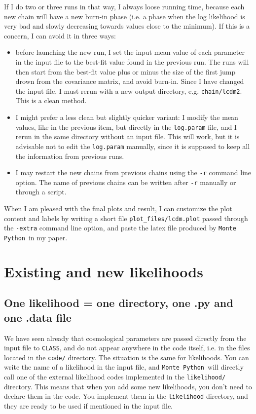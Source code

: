 \documentclass[10pt]{article}
\newcommand{\CLASS}{\texttt{CLASS}}
\newcommand{\MP}{\texttt{Monte Python}}
\begin{document}
If I do two or three runs in that way, I always loose running time, because each new chain will have a new burn-in phase (i.e. a phase when the log likelihood is very bad and slowly decreasing towards values close to the minimum). If this is a concern, I can avoid it in three ways:
\begin{itemize}
\item before launching the new run, I set the input mean value of each parameter in the input file to the best-fit value found in the previous run. The runs will then start from the best-fit value plus or minus the size of the first jump drown from the covariance matrix, and avoid burn-in. Since I have changed the input file, I must rerun with a new output directory, e.g. \verb?chain/lcdm2?. This is a clean method.
\item I might prefer a less clean but slightly quicker variant: I modify the mean values, like in the previous item, but directly in the \verb?log.param? file, and I rerun in the same directory without an input file. This will work, but it is advisable not to edit the \verb?log.param? manually, since it is supposed to keep all the information from previous runs.
\item I may restart the new chains from previous chains using the \verb?-r? command line option. The name of previous chains can be written after \verb?-r? manually or through a script.
\end{itemize}

When I am pleased with the final plots and result, I can customize the plot content and labels by writing a short file \verb?plot_files/lcdm.plot? passed through the \verb?-extra? command line option, and paste the latex file produced by \MP~in my paper.

\section{Existing and new likelihoods\label{likelihoods}}

\subsection{One likelihood = one directory, one .py and one .data file\label{ssec:lkl}}

We have seen already that cosmological parameters are passed directly from the input file to \CLASS, and do not appear anywhere in the code itself, i.e. in the files located in the \verb?code/? directory. The situation is the same for likelihoods. You can write the name of a likelihood in the input file, and \MP~will directly call one of the external likelihood codes implemented in the \verb?likelihood/? directory. This means that when you add some new likelihoods, you don't need to declare them in the code. You implement them in the \verb?likelihood? directory, and they are ready to be used if mentioned in the input file.
\end{document}
